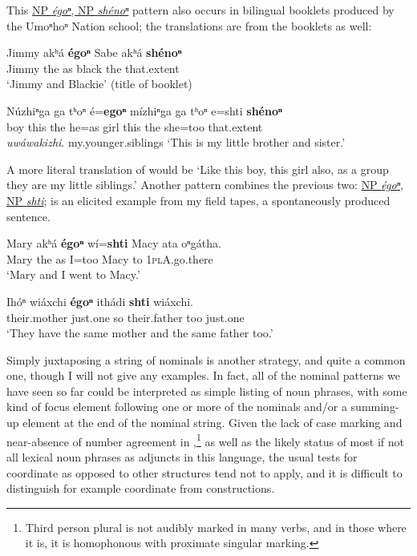 \documentclass[output=paper]{LSP/langsci}
\begin{document}
This \uline{NP \textit{égoⁿ}, NP \textit{shénoⁿ}} pattern also occurs in bilingual booklets produced by the Umoⁿhoⁿ Nation school; the translations are from the booklets as well:
	
\begin{exe}	
\ex\label{ex:rudin:25}
\gll Jimmy 	akʰá \textbf{égoⁿ} Sabe akʰá \textbf{shénoⁿ} \\
Jimmy the  	as 	black 	the  	that.extent \\
\trans `Jimmy and Blackie' (title of booklet)

\ex\label{ex:rudin:26} 
\gll Núzhiⁿga ga tʰoⁿ é=\textbf{egoⁿ} mízhiⁿga ga  tʰoⁿ e=shti 	\textbf{shénoⁿ}  \\
boy 	this 	the 	he=as   	girl   this the she=too  that.extent 	 \\

\textit{uwáwakizhi}.
my.younger.siblings
\trans `This is my little brother and sister.' 	
\end{exe}	 
	
A more literal translation of  would be `Like this boy, this girl also, as a group they are my little siblings.' Another pattern combines the previous two:   \uline{NP \textit{égoⁿ}, NP \textit{shti}};  is an elicited example from my field tapes,  a spontaneously produced sentence. 

\begin{exe}	
\ex\label{ex:rudin:27}
\gll Mary akʰá \textbf{égoⁿ}  wí=\textbf{shti} Macy 	ata 	oⁿgátha. \\
Mary the as I=too Macy to 	\textsc{1plA}.go.there \\
\trans`Mary and  I went to Macy.'

\ex\label{ex:rudin:28}
\gll Ihóⁿ  wiáxchi  \textbf{égoⁿ} ithádi  \textbf{shti} wiáxchi. \\
their.mother  just.one so their.father too just.one \\
\trans `They have the same mother and the same father too.'
\end{exe}	

Simply juxtaposing a string of nominals is another  strategy, and quite a common one, though I will not give any examples. In fact, all of the nominal  patterns we have seen so far could be interpreted as simple listing of noun phrases, with some kind of focus element following one or more of the nominals and/or a summing-up element at the end of the nominal string. Given the lack of case marking and near-absence of number agreement  in ,\footnote{Third person plural is not audibly marked in many verbs, and in those where it is, it is homophonous with
proximate singular marking.} as well as the likely status of most if not all lexical noun phrases as adjuncts in this language, the usual tests for coordinate as opposed to other structures tend not to apply, and it is difficult to distinguish for example coordinate from  constructions.
\end{document}
